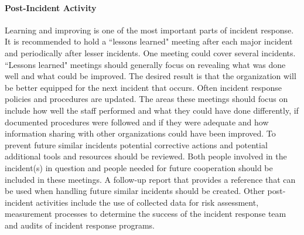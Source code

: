 \paragraph{Post-Incident Activity}
Learning and improving is one of the most important parts of incident response. It is recommended to hold a ``lessons learned" meeting after each major incident and periodically after lesser incidents. One meeting could cover several incidents. ``Lessons learned" meetings should generally focus on revealing what was done well and what could be improved. The desired result is that the organization will be better equipped for the next incident that occurs. Often incident response policies and procedures are updated. The areas these meetings should focus on include how well the staff performed and what they could have done differently, if documented procedures were followed and if they were adequate and how information sharing with other organizations could have been improved. To prevent future similar incidents potential corrective actions and potential additional tools and resources should be reviewed. Both people involved in the incident(s) in question and people needed for future cooperation should be included in these meetings. A follow-up report that provides a reference that can be used when handling future similar incidents should be created. Other post-incident activities include the use of collected data for risk assessment, measurement processes to determine the success of the incident response team and audits of incident response programs. 



